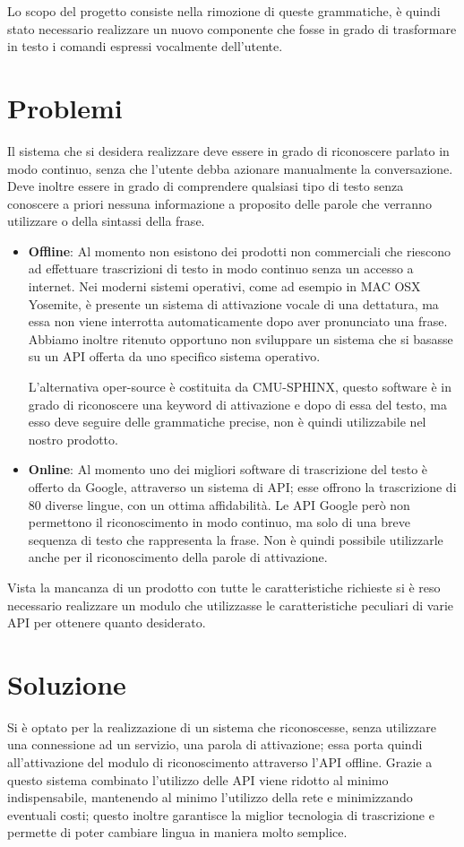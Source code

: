 \documentclass[twoside]{supsistudent}
\begin{document}
Lo scopo del progetto consiste nella rimozione di queste grammatiche, è quindi stato necessario realizzare un nuovo componente che fosse in grado di trasformare in testo i comandi espressi vocalmente dell'utente.
\section{Problemi}
Il sistema che si desidera realizzare deve essere in grado di riconoscere parlato in modo continuo, senza che l'utente debba azionare manualmente la conversazione. 
Deve inoltre essere in grado di comprendere qualsiasi tipo di testo senza conoscere a priori nessuna informazione a proposito delle parole che verranno utilizzare o della sintassi della frase. 


\begin{itemize}
	\item \textbf{Offline}: Al momento non esistono dei prodotti non commerciali che riescono ad effettuare trascrizioni di testo in modo continuo senza un accesso a internet. Nei moderni sistemi operativi, come ad esempio in MAC OSX Yosemite, è presente un sistema di 		attivazione vocale di una dettatura, ma essa non viene interrotta automaticamente dopo aver pronunciato una frase. Abbiamo inoltre ritenuto opportuno non sviluppare un sistema che si basasse su un API offerta da uno specifico sistema operativo. 
	
	L'alternativa oper-source è costituita da CMU-SPHINX, questo software è in grado di riconoscere una keyword di attivazione e dopo di essa del testo, ma esso deve seguire delle grammatiche precise, non è quindi utilizzabile nel nostro prodotto.
	\item \textbf{Online}: Al momento uno dei migliori software di trascrizione del testo è offerto da Google, attraverso un sistema di API; esse offrono la trascrizione di 80 diverse lingue, con un ottima affidabilità.
		Le API Google però non permettono il riconoscimento in modo continuo, ma solo di una breve sequenza di testo che rappresenta la frase.
		Non è quindi possibile utilizzarle anche per il riconoscimento della parole di attivazione.
\end{itemize}

Vista la mancanza di un prodotto con tutte le caratteristiche richieste si è reso necessario realizzare un modulo che utilizzasse le caratteristiche peculiari di varie API per ottenere quanto desiderato.


\section{Soluzione}
Si è optato per la realizzazione di un sistema che riconoscesse, senza utilizzare una connessione ad un servizio, una parola di attivazione; essa porta quindi all'attivazione del modulo di riconoscimento attraverso l'API offline.
Grazie a questo sistema combinato l'utilizzo delle API viene ridotto al minimo indispensabile, mantenendo al minimo l'utilizzo della rete e minimizzando eventuali costi; questo inoltre garantisce la miglior tecnologia di trascrizione e permette di poter cambiare lingua in maniera molto semplice.
\end{document}
